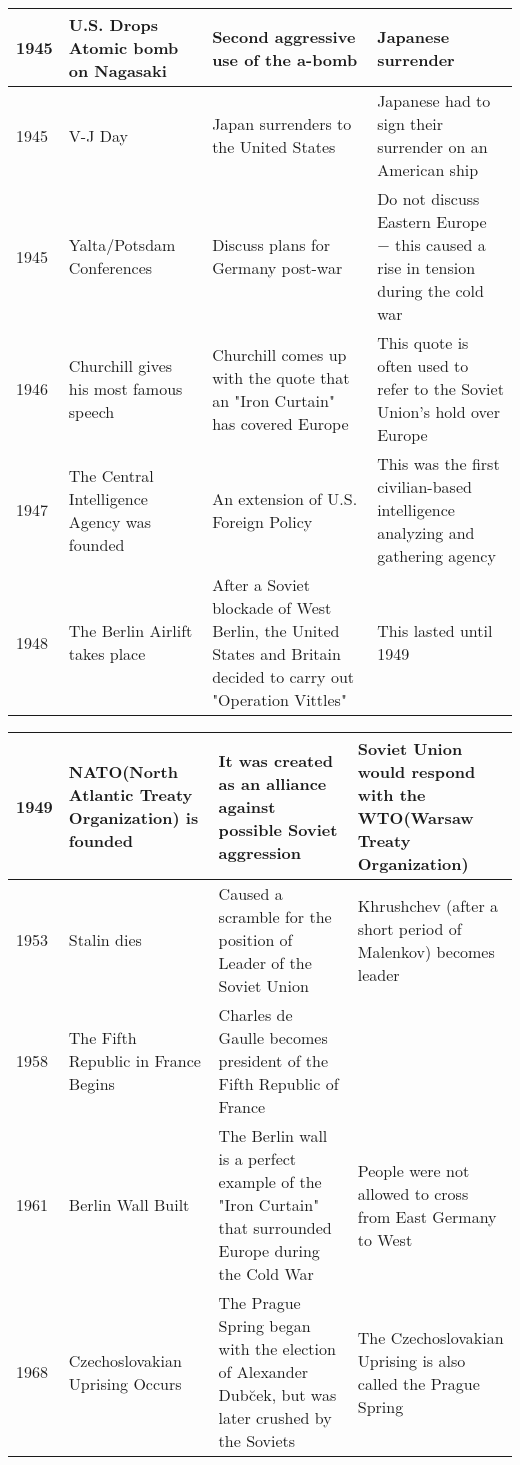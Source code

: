 \documentclass[12pt]{article}
\begin{document}
\begin{enumerate}
\begin{tabular}{|p{}|p{}|p{}|p{}|}
\hline
1945 & U.S. Drops Atomic bomb on Nagasaki  & Second aggressive use of the a-bomb & Japanese surrender  \\
\hline
1945 & V-J Day  & Japan surrenders to the United States  & Japanese had to sign their surrender on an American ship  \\
\hline
1945 & Yalta/Potsdam Conferences  & Discuss plans for Germany post-war  & Do not discuss Eastern Europe $-$ this caused a rise in tension during the cold war  \\
\hline
1946 & Churchill gives his most famous speech  & Churchill comes up with the quote that an "Iron Curtain" has covered Europe  & This quote is often used to refer to the Soviet Union's hold over Europe  \\
\hline
1947 & The Central Intelligence Agency was founded  & An extension of U.S. Foreign Policy & This was the first civilian-based intelligence analyzing and gathering agency  \\
\hline
1948 & The Berlin Airlift takes place  & After a Soviet blockade of West Berlin, the United States and Britain decided to carry out "Operation Vittles"  & This lasted until 1949  \\
\hline
\end{tabular}
\newpage
\hspace{-25pt}\begin{tabular}{|p{}|p{}|p{}|p{}|}
\hline
1949 & NATO(North Atlantic Treaty Organization) is founded & It was created as an alliance against possible Soviet aggression & Soviet Union would respond with the WTO(Warsaw Treaty Organization) \\
\hline
1953 & Stalin dies  & Caused a scramble for the position of Leader of the Soviet Union  & Khrushchev (after a short period of Malenkov) becomes leader \\
1958 & The Fifth Republic in France Begins  & Charles de Gaulle becomes president of the Fifth Republic of France  & \\
\hline
1961 & Berlin Wall Built  & The Berlin wall is a perfect example of the "Iron Curtain" that surrounded Europe during the Cold War  & People were not allowed to cross from East Germany to West  \\
\hline
1968 & Czechoslovakian Uprising Occurs  & The Prague Spring began with the election of Alexander Dub\u cek, but was later crushed by the Soviets  & The Czechoslovakian Uprising is also called the Prague Spring  \\
\hline

\end{tabular}
\end{enumerate}
\end{document}
